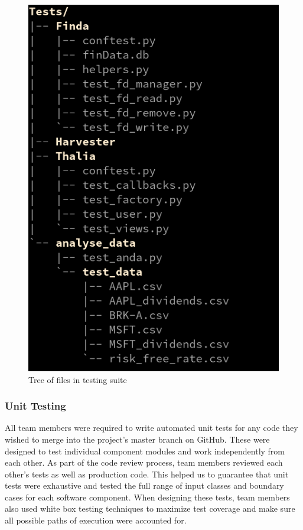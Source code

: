 \documentclass[main.tex]{subfiles}
\begin{document}
\begin{figure}[H]
   \centering
   \includegraphics[scale=0.3]{06Testing/06Pictures/testingSuiteStructure.png}
   \caption{Tree of files in testing suite}
   \label{Testing Suite}
\end{figure}

\subsubsection{Unit Testing}
All team members were required to write automated unit tests for any code they wished to merge into the project’s master branch on GitHub. These were designed to test individual component modules and work independently from each other. As part of the code review process, team members reviewed each other's tests as well as production code. This helped us to guarantee that unit tests were exhaustive and tested the full range of input classes and boundary cases for each software component. When designing these tests, team members also used white box testing techniques to maximize test coverage and make sure all possible paths of execution were accounted for.
\end{document}
